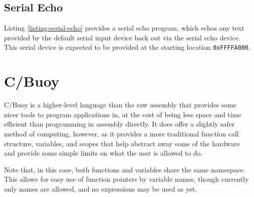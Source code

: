 \documentclass{article}
\begin{document}


\pagebreak

\subsection{Serial Echo}

Listing \ref{listing:serial-echo} provides a serial echo program, which echos any text provided by the default serial input device back out via the serial echo device. This serial device is expected to be provided at the starting location \texttt{0xFFFFA000}.



\pagebreak

\section{C/Buoy}

C/Buoy is a higher-level language than the raw assembly that provides some nicer tools to program applications in, at the cost of being less space and time efficient than programming in assembly directly. It does offer a slightly safer method of computing, however, as it provides a more traditional function call structure, variables, and scopes that help abstract away some of the hardware and provide some simple limits on what the user is allowed to do.

Note that, in this case, both functions and variables share the same namespace. This allows for easy use of function pointers by variable names, though currently only names are allowed, and no expressions may be used as yet.
\end{document}
